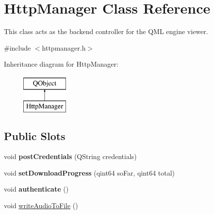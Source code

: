 \hypertarget{classHttpManager}{\section{Http\-Manager Class Reference}
\label{classHttpManager}
}


This class acts as the backend controller for the Q\-M\-L engine viewer.  




{\ttfamily \#include $<$httpmanager.\-h$>$}

Inheritance diagram for Http\-Manager\-:\begin{figure}[H]
\begin{center}
\leavevmode
\includegraphics[height=2.000000cm]{classHttpManager}
\end{center}
\end{figure}
\subsection*{Public Slots}
\begin{DoxyCompactItemize}
\item 
\hypertarget{classHttpManager_ac1e6cdef1723a7b28a348b3046ddfe86}{void {\bfseries post\-Credentials} (Q\-String credentials)}\label{classHttpManager_ac1e6cdef1723a7b28a348b3046ddfe86}

\item 
\hypertarget{classHttpManager_ac2d51aca5099ecc22abed34fc2d20083}{void {\bfseries set\-Download\-Progress} (qint64 so\-Far, qint64 total)}\label{classHttpManager_ac2d51aca5099ecc22abed34fc2d20083}

\item 
\hypertarget{classHttpManager_a7dd56984ebb6adbad298a755c0b4d66a}{void {\bfseries authenticate} ()}\label{classHttpManager_a7dd56984ebb6adbad298a755c0b4d66a}

\item 
void \hyperlink{classHttpManager_a5a810bffa61e583780bfdaca7e85a9fd}{write\-Audio\-To\-File} ()
\end{DoxyCompactItemize}
